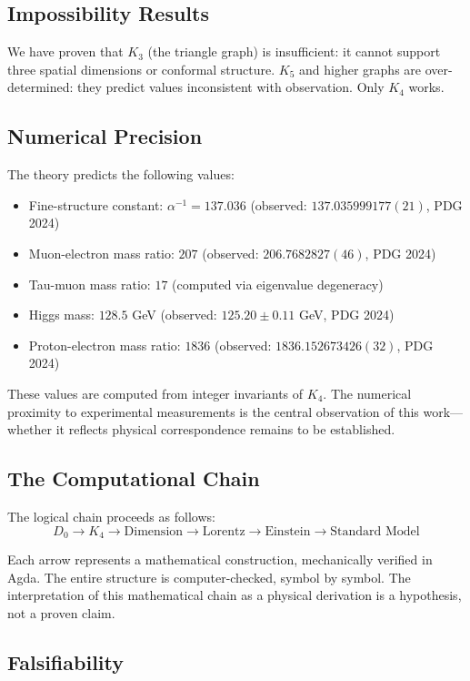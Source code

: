 \documentclass[11pt,a4paper]{book}
\begin{document}
\subsection{Impossibility Results}

We have proven that $K_3$ (the triangle graph) is insufficient: it cannot support three spatial dimensions or conformal structure.
$K_5$ and higher graphs are over-determined: they predict values inconsistent with observation.
Only $K_4$ works.

\subsection{Numerical Precision}

The theory predicts the following values:
\begin{itemize}
\item Fine-structure constant: $\alpha^{-1} = 137.036$ (observed: $137.035999177(21)$, PDG 2024)
\item Muon-electron mass ratio: $207$ (observed: $206.7682827(46)$, PDG 2024)
\item Tau-muon mass ratio: $17$ (computed via eigenvalue degeneracy)
\item Higgs mass: $128.5$ GeV (observed: $125.20 \pm 0.11$ GeV, PDG 2024)
\item Proton-electron mass ratio: $1836$ (observed: $1836.152673426(32)$, PDG 2024)
\end{itemize}

These values are computed from integer invariants of $K_4$. 
The numerical proximity to experimental measurements is the central observation 
of this work---whether it reflects physical correspondence remains to be established.

\subsection{The Computational Chain}

The logical chain proceeds as follows:
\[
D_0 \to K_4 \to \text{Dimension} \to \text{Lorentz} \to \text{Einstein} \to \text{Standard Model}
\]

Each arrow represents a mathematical construction, mechanically verified in Agda. The entire 
structure is computer-checked, symbol by symbol. The interpretation of this mathematical 
chain as a physical derivation is a hypothesis, not a proven claim.

\subsection{Falsifiability}
\end{document}
